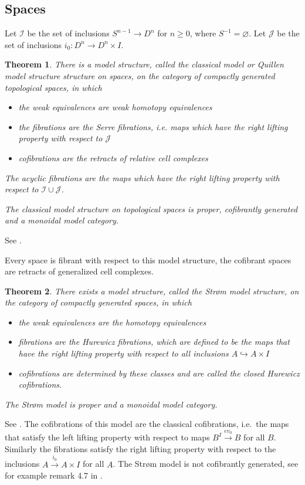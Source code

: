 \documentclass{scrartcl}
\theoremstyle{plain}
\newtheorem{theorem}{Theorem}[section]
\theoremstyle{definition}
\newcommand{\cat}[1]{\mathcal{#1}}
\renewcommand{\emptyset}{\varnothing}
\newcommand{\union}{\mathbin{\cup}}
\let\xto\xrightarrow
\newcommand{\injto}{\hookrightarrow}
\begin{document}
\subsection{Spaces}\label{subsec:spaces_modelcat}
Let $\cat I$ be the set of inclusions $S^{n-1}\to D^n$ for $n\geq 0$, where $S^{-1}=\emptyset$. Let $\cat J$ be the set of inclusions $i_0\colon D^n\to D^n\times I$.
\begin{theorem}
There is a model structure, called the classical model or Quillen model structure structure on spaces, on the category of compactly generated topological spaces, in which
\begin{itemize}
    \item the weak equivalences are weak homotopy equivalences
    \item the fibrations are the Serre fibrations, i.e. maps which have the right lifting property with respect to $\cat J$
    \item cofibrations are the retracts of relative cell complexes
\end{itemize}
The acyclic fibrations are the maps which have the right lifting property with respect to $\cat I\union\cat J$. 

The classical model structure on topological spaces is proper, cofibrantly generated and a monoidal model category. 
\end{theorem}
See \cite[17.2.2]{may2011more}.

Every space is fibrant with respect to this model structure, the cofibrant spaces are retracts of generalized cell complexes.


\begin{theorem}
    There exists a model structure, called the Strøm model structure, on the category of compactly generated spaces, in which
    \begin{itemize}
        \item the weak equivalences are the homotopy equivalences
        \item fibrations are the Hurewicz fibrations, which are defined to be the maps that have the right lifting property with respect to all inclusions $A\injto A\times I$
        \item cofibrations are determined by these classes and are called the closed Hurewicz cofibrations.
    \end{itemize} 
    The Strøm model is proper and a monoidal model category. 
\end{theorem}
See \cite[17.1.1 and 17.1.3]{may2011more}.
The cofibrations of this model are the classical cofibrations, i.e.\ the maps that satisfy the left lifting property with respect to maps $B^I\xto{ev_0} B$ for all $B$. Similarly the fibrations satisfy the right lifting property with respect to the inclusions $A\xto{i_0} A\times I$ for all $A$. The Strøm model is not cofibrantly generated, see for example remark 4.7 in \cite{raptis2010homotopy}.
\end{document}
